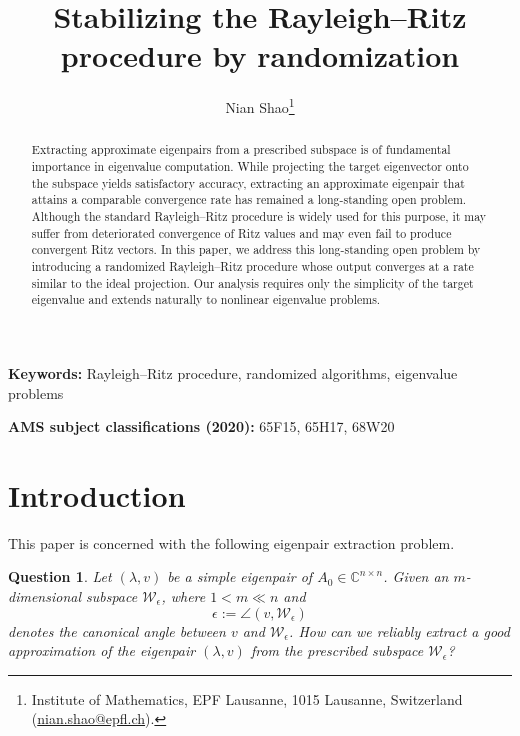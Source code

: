 \documentclass[a4paper,11pt]{article}
\newtheorem{question}{Question}
\newcommand{\defi}{:=}
\newcommand{\C}{\mathbb{C}}
\begin{document}
\title{Stabilizing the Rayleigh--Ritz procedure by randomization}
\author{ 
    Nian Shao\thanks{
         Institute of Mathematics, EPF Lausanne, 1015 Lausanne, Switzerland
         (\href{mailto:nian.shao@epfl.ch}{nian.shao@epfl.ch}).
     }
}
\maketitle

\begin{abstract}
Extracting approximate eigenpairs from a prescribed subspace is of fundamental importance in eigenvalue computation.
While projecting the target eigenvector onto the subspace yields satisfactory accuracy, extracting an approximate eigenpair that attains a comparable convergence rate has remained a long-standing open problem.
Although the standard Rayleigh--Ritz procedure is widely used for this purpose, it may suffer from deteriorated convergence of Ritz values and may even fail to produce convergent Ritz vectors.
In this paper, we address this long-standing open problem by introducing a randomized Rayleigh--Ritz procedure whose output converges at a rate similar to the ideal projection.
Our analysis requires only the simplicity of the target eigenvalue and extends naturally to nonlinear eigenvalue problems.


\end{abstract}

\medskip\textbf{Keywords:} Rayleigh--Ritz procedure, randomized algorithms,  eigenvalue problems

\medskip\textbf{AMS subject classifications (2020):} 65F15, 65H17, 68W20

\section{Introduction}
This paper is concerned with the following eigenpair extraction problem.
\begin{question}
    \label{Q}
    Let $(\lambda,v)$ be a simple eigenpair of $A_{0}\in\C^{n\times n}$. Given an $m$-dimensional subspace $\mathcal{W}_{\epsilon}$, where $1<m\ll n$ and 
\begin{equation*}
    \epsilon\defi \angle(v,\mathcal{W}_{\epsilon})
\end{equation*}
denotes the canonical angle between $v$ and $\mathcal{W}_{\epsilon}$. How can we reliably extract a good approximation of the eigenpair $(\lambda,v)$ from the prescribed subspace $\mathcal{W}_{\epsilon}$? 
\end{question}
\end{document}
